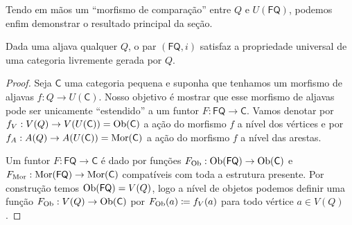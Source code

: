 Tendo em mãos um ``morfismo de comparação'' entre $Q$ e $U(\mathsf{FQ})$, podemos enfim demonstrar o resultado principal da seção.

\begin{teo}\label{teo:categoria_livremente_gerada_por_aljava}
    Dada uma aljava qualquer $Q$, o par $(\mathsf{FQ},i)$ satisfaz a propriedade universal de uma categoria livremente gerada por $Q$.
\end{teo}

\begin{proof}
    Seja $\mathsf{C}$ uma categoria pequena e suponha que tenhamos um morfismo de aljavas $f: Q \to U(\mathsf{C})$.
    Nosso objetivo é mostrar que esse morfismo de aljavas pode ser unicamente ``estendido'' a um funtor $F: \mathsf{FQ} \to \mathsf{C}$.
    Vamos denotar por $f_V: V(Q) \to V(U(\mathsf{C})) = \mathrm{Ob}(\mathsf{C})$ a ação do morfismo $f$ a nível dos vértices e por $f_A: A(Q) \to A(U(\mathsf{C})) = \mathrm{Mor}(\mathsf{C})$ a ação do morfismo $f$ a nível das arestas.

    Um funtor $F: \mathsf{FQ} \to \mathsf{C}$ é dado por funções $F_{\mathrm{Ob}}: \mathrm{Ob}(\mathsf{FQ}) \to \mathrm{Ob}(\mathsf{C})$ e $F_{\mathrm{Mor}}: \mathrm{Mor}(\mathsf{FQ}) \to \mathrm{Mor}(\mathsf{C})$ compatíveis com toda a estrutura presente.
    Por construção temos $\mathrm{Ob}(\mathsf{FQ}) = V(Q)$, logo a nível de objetos podemos definir uma função $F_{\mathrm{Ob}}: V(Q) \to \mathrm{Ob}(\mathsf{C})$ por $F_{\mathrm{Ob}}(a) \coloneqq f_V(a)$ para todo vértice $a \in V(Q)$.


\end{proof}
